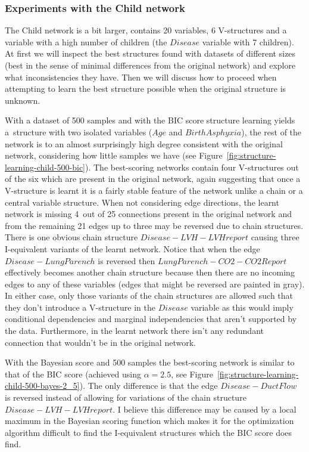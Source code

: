 \documentclass[english,cover]{fitthesis} %
\begin{document}
\subsubsection{Experiments with the Child network}
The Child network is a bit larger, contains 20 variables, 6 V-structures and a variable with a high number of children (the $Disease$ variable with 7 children). At first we will inspect the best structures found with datasets of different sizes (best in the sense of minimal differences from the original network) and explore what inconsistencies they have. Then we will discuss how to proceed when attempting to learn the best structure possible when the original structure is unknown.

With a dataset of 500 samples and with the BIC score structure learning yields a~structure with two isolated variables ($Age$ and $BirthAsphyxia$), the rest of the network is to an almost surprisingly high degree consistent with the original network, considering how little samples we have (see Figure~\ref{fig:structure-learning-child-500-bic}). The best-scoring networks contain four V-structures out of the six which are present in the original network, again suggesting that once a V-structure is learnt it is a fairly stable feature of the network unlike a chain or a central variable structure. When not considering edge directions, the learnt network is missing 4~out of 25 connections present in the original network and from the remaining 21 edges up to three may be reversed due to chain structures. There is one obvious chain structure $Disease - LVH - LVHreport$ causing three I-equivalent variants of the learnt network. Notice that when the edge $Disease - LungParench$ is reversed then $LungParench - CO2 - CO2Report$ effectively becomes another chain structure because then there are no incoming edges to any of these variables (edges that might be reversed are painted in gray). In either case, only those variants of the chain structures are allowed such that they don't introduce a V-structure in the $Disease$ variable as this would imply conditional dependencies and marginal independencies that aren't supported by the data. Furthermore, in the learnt network there isn't any redundant connection that wouldn't be in the original network.

With the Bayesian score and 500 samples the best-scoring network is similar to that of the BIC score (achieved using $\alpha=2.5$, see Figure~\ref{fig:structure-learning-child-500-bayes-2_5}). The only difference is that the edge $Disease - DuctFlow$ is reversed instead of allowing for variations of the chain structure $Disease - LVH - LVHreport$. I believe this difference may be caused by a local maximum in the Bayesian scoring function which makes it for the optimization algorithm difficult to find the I-equivalent structures which the BIC score does find.
\end{document}
